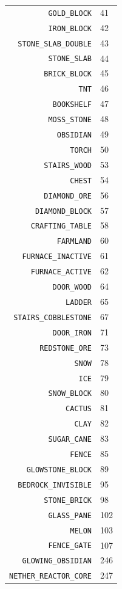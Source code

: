 \documentclass[twocolumn]{geocraft-worksheet}
\begin{document}
\begin{center}
\begin{supertabular} { | r | l | }
\verb|GOLD_BLOCK|          &   41 \\
\verb|IRON_BLOCK|          &   42 \\
\verb|STONE_SLAB_DOUBLE|   &   43 \\
\verb|STONE_SLAB|          &   44 \\
\verb|BRICK_BLOCK|         &   45 \\
\verb|TNT|                 &   46 \\
\verb|BOOKSHELF|           &   47 \\
\verb|MOSS_STONE|          &   48 \\
\verb|OBSIDIAN|            &   49 \\
\verb|TORCH|               &   50 \\
\verb|STAIRS_WOOD|         &   53 \\
\verb|CHEST|               &   54 \\
\verb|DIAMOND_ORE|         &   56 \\
\verb|DIAMOND_BLOCK|       &   57 \\
\verb|CRAFTING_TABLE|      &   58 \\
\verb|FARMLAND|            &   60 \\
\verb|FURNACE_INACTIVE|    &   61 \\
\verb|FURNACE_ACTIVE|      &   62 \\
\verb|DOOR_WOOD|           &   64 \\
\verb|LADDER|              &   65 \\
\verb|STAIRS_COBBLESTONE|  &   67 \\
\verb|DOOR_IRON|           &   71 \\
\verb|REDSTONE_ORE|        &   73 \\
\verb|SNOW|                &   78 \\
\verb|ICE|                 &   79 \\
\verb|SNOW_BLOCK|          &   80 \\
\verb|CACTUS|              &   81 \\
\verb|CLAY|                &   82 \\
\verb|SUGAR_CANE|          &   83 \\
\verb|FENCE|               &   85 \\
\verb|GLOWSTONE_BLOCK|     &   89 \\
\verb|BEDROCK_INVISIBLE|   &   95 \\
\verb|STONE_BRICK|         &   98 \\
\verb|GLASS_PANE|          &  102 \\
\verb|MELON|               &  103 \\
\verb|FENCE_GATE|          &  107 \\
\verb|GLOWING_OBSIDIAN|   &  246 \\
\verb|NETHER_REACTOR_CORE| &  247 \\
    \end{supertabular}
\end{center}
\end{document}
